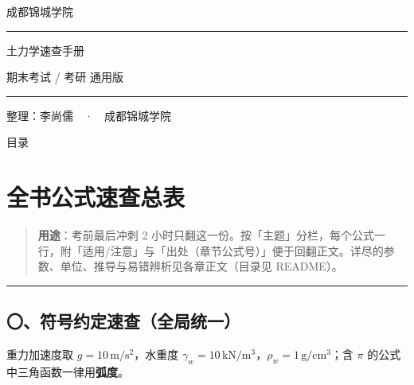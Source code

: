 \documentclass[
]{article}
\author{}
\date{}
\begin{document}
\thispagestyle{plain}
\begin{center}
\vspace*{2.2cm}
{\fontsize{14pt}{20pt}\selectfont 成都锦城学院}

\vspace{0.9cm}
\rule{10cm}{0.4pt}

\vspace{5.4cm}
{\fontsize{32pt}{44pt}\selectfont\heiti 土力学速查手册}

\vspace{0.9cm}
{\fontsize{16pt}{22pt}\selectfont 期末考试 / 考研 通用版}

\vspace{1.1cm}
\rule{6cm}{0.5pt}

\vspace{4.5cm}
{\fontsize{14pt}{20pt}\selectfont\kaishu 整理：李尚儒　·　成都锦城学院}
\end{center}

\newpage

\setcounter{tocdepth}{1}
\begin{center}
{\fontsize{18pt}{24pt}\selectfont\heiti 目录}
\end{center}
\tableofcontents

\newpage

\section{全书公式速查总表}\label{ux5168ux4e66ux516cux5f0fux901fux67e5ux603bux8868}

\begin{quote}
\textbf{用途}：考前最后冲刺 2
小时只翻这一份。按「主题」分栏，每个公式一行，附「适用/注意」与「出处（章节公式号）」便于回翻正文。详尽的参数、单位、推导与易错辨析见各章正文（目录见
README）。
\end{quote}

\begin{center}\rule{0.5\linewidth}{0.5pt}\end{center}

\subsection{〇、符号约定速查（全局统一）}\label{ux7b26ux53f7ux7ea6ux5b9aux901fux67e5ux5168ux5c40ux7edfux4e00}

重力加速度取 \(g=10\,\mathrm{m/s^2}\)，水重度
\(\gamma_w=10\,\mathrm{kN/m^3}\)，\(\rho_w=1\,\mathrm{g/cm^3}\)；含
\(\pi\) 的公式中三角函数一律用\textbf{弧度}。
\end{document}
